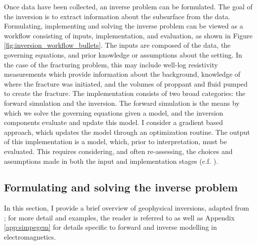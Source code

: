 Once data have been collected, an inverse problem can be formulated. The goal of the inversion is to extract information about the subsurface from the data. Formulating, implementing and solving the inverse problem can be viewed as a workflow consisting of inputs, implementation, and evaluation, as shown in Figure \ref{fig:inversion_workflow_bullets}. The inputs are composed of the data, the governing equations, and prior knowledge or assumptions about the setting. In the case of the fracturing problem, this may include well-log resistivity measurements which provide information about the background, knowledge of where the fracture was initiated, and the volumes of proppant and fluid pumped to create the fracture.
The implementation consists of two broad categories: the forward simulation and the inversion. The forward simulation is the means by which we solve the governing equations given a model, and the inversion components evaluate and update this model. I consider a gradient based approach, which updates the model through an optimization routine. The output of this implementation is a model, which, prior to interpretation, must be evaluated. This requires considering, and often re-assessing, the choices and assumptions made in both the input and implementation stages (c.f. \cite{Oldenburg2005, Haber2014a, Cockett2015}).



\subsection{Formulating and solving the inverse problem}
In this section, I provide a brief overview of geophysical inversions, adapted from \cite{Cockett2015}; for more detail and examples, the reader is referred to \cite{Oldenburg2005, Cockett2015} as well as Appendix \ref{app:simpegem} for details specific to forward and inverse modelling in electromagnetics.

